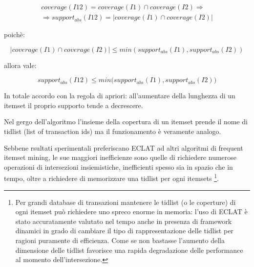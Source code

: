 \begin{equation}
\begin{split}
coverage(I12) = coverage(I1) \cap coverage(I2) \Rightarrow \\ 
\Rightarrow support_{abs}(I12) = \lvert coverage(I1) \cap coverage(I2) \rvert
\end{split}
\end{equation}
 
poich{\`e}:

\begin{equation}
\lvert coverage(I1) \cap coverage(I2) \rvert \leq min(support_{abs}(I1), support_{abs}(I2))
\end{equation}

allora vale:

\begin{equation}
support_{abs}(I12) \leq min \bigl( support_{abs}(I1),support_{abs}(I2) \bigr)
\end{equation}

In totale accordo con la regola di apriori: all'aumentare della lunghezza di un itemset il proprio supporto tende a decrescere.

Nel gergo dell'algoritmo l'insieme della copertura di un itemset prende il nome di tidlist (list of transaction ids) ma il funzionamento {\`e} veramente analogo. 

Sebbene rsultati sperimentali preferiscano ECLAT ad altri algoritmi di frequent itemset mining, le sue maggiori inefficienze sono quelle di richiedere numerose operazioni di intersezioni insiemistiche, inefficienti spesso sia in spazio che in tempo, oltre a richiedere di memorizzare una tidlist per ogni itemsets \footnote{Per grandi database di transazioni mantenere le tidlist (o le coperture) di ogni itemset pu{\`o} richiedere uno spreco enorme in memoria: l'uso di ECLAT {\`e} stato accuratamente valutato nel tempo anche in presenza di framework dinamici in grado di cambiare il tipo di rappresentazione delle tidlist per ragioni puramente di efficienza. Come se non bastasse l'aumento della dimensione delle tidlist favorisce una rapida degradazione delle performance al momento dell'intersezione.}.